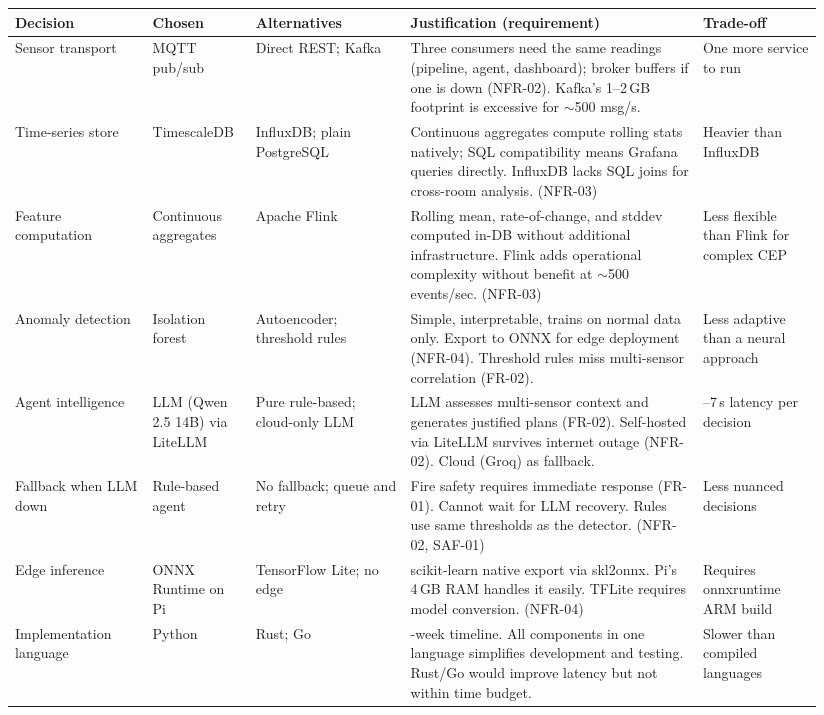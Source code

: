 \documentclass[11pt]{article}
\begin{document}
\begin{longtable}[]{@{}
  >{\raggedright\arraybackslash}p{0.16\linewidth}
  >{\raggedright\arraybackslash}p{0.12\linewidth}
  >{\raggedright\arraybackslash}p{0.18\linewidth}
  >{\raggedright\arraybackslash}p{0.34\linewidth}
  >{\raggedright\arraybackslash}p{0.14\linewidth}@{}}
\toprule
\textbf{Decision} & \textbf{Chosen} & \textbf{Alternatives} & \textbf{Justification (requirement)} & \textbf{Trade-off} \\
\midrule
\endhead
Sensor transport & MQTT pub/sub & Direct REST; Kafka & Three consumers need the same readings (pipeline, agent, dashboard); broker buffers if one is down (NFR-02). Kafka's 1--2\,GB footprint is excessive for $\sim$500 msg/s. & One more service to run \\
Time-series store & TimescaleDB & InfluxDB; plain PostgreSQL & Continuous aggregates compute rolling stats natively; SQL compatibility means Grafana queries directly. InfluxDB lacks SQL joins for cross-room analysis. (NFR-03) & Heavier than InfluxDB \\
Feature computation & Continuous aggregates & Apache Flink & Rolling mean, rate-of-change, and stddev computed in-DB without additional infrastructure. Flink adds operational complexity without benefit at $\sim$500 events/sec. (NFR-03) & Less flexible than Flink for complex CEP \\
Anomaly detection & Isolation forest & Autoencoder; threshold rules & Simple, interpretable, trains on normal data only. Export to ONNX for edge deployment (NFR-04). Threshold rules miss multi-sensor correlation (FR-02). & Less adaptive than a neural approach \\
Agent intelligence & LLM (Qwen 2.5 14B) via LiteLLM & Pure rule-based; cloud-only LLM & LLM assesses multi-sensor context and generates justified plans (FR-02). Self-hosted via LiteLLM survives internet outage (NFR-02). Cloud (Groq) as fallback. & 3--7\,s latency per decision \\
Fallback when LLM down & Rule-based agent & No fallback; queue and retry & Fire safety requires immediate response (FR-01). Cannot wait for LLM recovery. Rules use same thresholds as the detector. (NFR-02, SAF-01) & Less nuanced decisions \\
Edge inference & ONNX Runtime on Pi & TensorFlow Lite; no edge & scikit-learn native export via skl2onnx. Pi's 4\,GB RAM handles it easily. TFLite requires model conversion. (NFR-04) & Requires onnxruntime ARM build \\
Implementation language & Python & Rust; Go & 5-week timeline. All components in one language simplifies development and testing. Rust/Go would improve latency but not within time budget. & Slower than compiled languages \\

\end{longtable}
\end{document}
